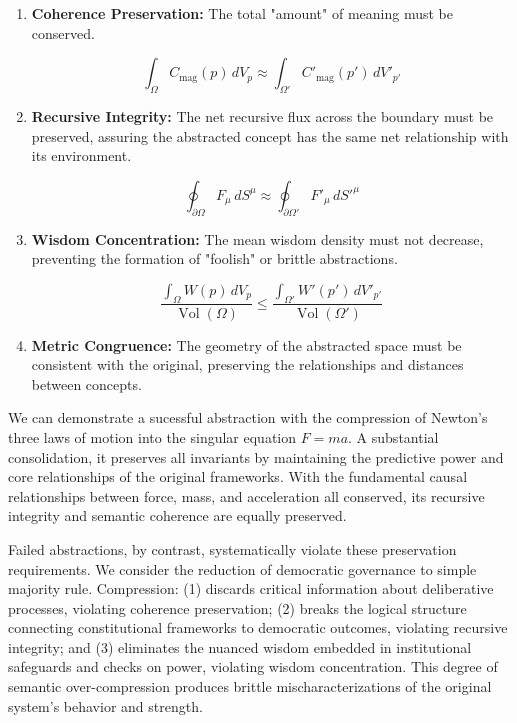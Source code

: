 \begin{enumerate}

    \item \textbf{Coherence Preservation:} The total "amount" of meaning must be conserved.

    \begin{equation}
    \int_{\Omega} C_{\text{mag}}(p) \, dV_p \approx \int_{\Omega'} C'_{\text{mag}}(p') \, dV'_{p'}
    \end{equation}

    \item \textbf{Recursive Integrity:} The net recursive flux across the boundary must be preserved, assuring the abstracted concept has the same net relationship with its environment.

    \begin{equation}
    \oint_{\partial \Omega} F_\mu \, dS^\mu \approx \oint_{\partial \Omega'} F'_\mu \, dS'^\mu
    \end{equation}

    \item \textbf{Wisdom Concentration:} The mean wisdom density must not decrease, preventing the formation of "foolish" or brittle abstractions.

    \begin{equation}
    \frac{\int_{\Omega} W(p) \, dV_p}{\operatorname{Vol}(\Omega)} \leq \frac{\int_{\Omega'} W'(p') \, dV'_{p'}}{\operatorname{Vol}(\Omega')}
    \end{equation}

    \item \textbf{Metric Congruence:} The geometry of the abstracted space must be consistent with the original, preserving the relationships and distances between concepts.
\end{enumerate}

We can demonstrate a sucessful abstraction with the compression of Newton's three laws of motion into the singular equation \(F=ma\). A substantial consolidation, it preserves all invariants by maintaining the predictive power and core relationships of the original frameworks. With the fundamental causal relationships between force, mass, and acceleration all conserved, its recursive integrity and semantic coherence are equally preserved.

Failed abstractions, by contrast, systematically violate these preservation requirements. We consider the reduction of democratic governance to simple majority rule. Compression: (1) discards critical information about deliberative processes, violating coherence preservation; (2) breaks the logical structure connecting constitutional frameworks to democratic outcomes, violating recursive integrity; and (3) eliminates the nuanced wisdom embedded in institutional safeguards and checks on power, violating wisdom concentration. This degree of semantic over-compression produces brittle mischaracterizations of the original system's behavior and strength.


